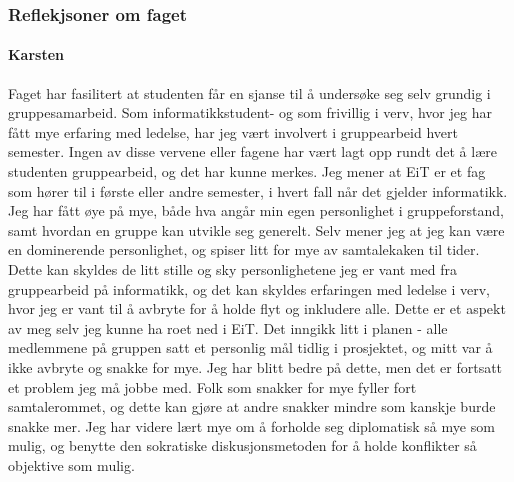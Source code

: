 \subsubsection{Reflekjsoner om faget}

\paragraph{Karsten}
Faget har fasilitert at studenten får en sjanse til å undersøke seg selv grundig i gruppesamarbeid. 
Som informatikkstudent- og som frivillig i verv, hvor jeg har fått mye erfaring med ledelse, har jeg vært involvert i gruppearbeid hvert semester. 
Ingen av disse vervene eller fagene har vært lagt opp rundt det å lære studenten gruppearbeid, og det har kunne merkes. 
Jeg mener at EiT er et fag som hører til i første eller andre semester, i hvert fall når det gjelder informatikk. 
Jeg har fått øye på mye, både hva angår min egen personlighet i gruppeforstand, samt hvordan en gruppe kan utvikle seg generelt. 
Selv mener jeg at jeg kan være en dominerende personlighet, og spiser litt for mye av samtalekaken til tider. 
Dette kan skyldes de litt stille og sky personlighetene jeg er vant med fra gruppearbeid på informatikk, og det kan skyldes erfaringen med ledelse i verv, hvor jeg er vant til å avbryte for å holde flyt og inkludere alle. 
Dette er et aspekt av meg selv jeg kunne ha roet ned i EiT. Det inngikk litt i planen - alle medlemmene på gruppen satt et personlig mål tidlig i prosjektet, og mitt var å ikke avbryte og snakke for mye. 
Jeg har blitt bedre på dette, men det er fortsatt et problem jeg må jobbe med. 
Folk som snakker for mye fyller fort samtalerommet, og dette kan gjøre at andre snakker mindre som kanskje burde snakke mer. 
Jeg har videre lært mye om å forholde seg diplomatisk så mye som mulig, og benytte den sokratiske diskusjonsmetoden for å holde konflikter så objektive som mulig. 

